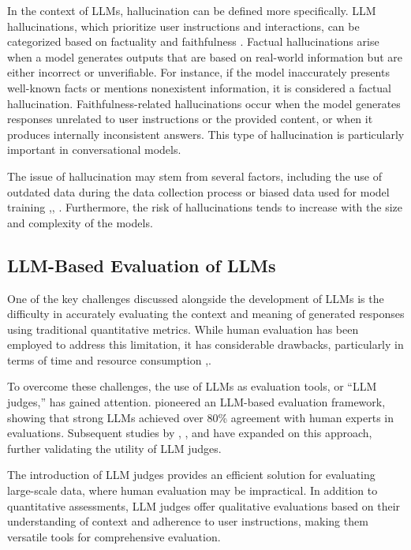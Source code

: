 In the context of LLMs, hallucination can be defined more specifically. LLM hallucinations, which prioritize user instructions and interactions, can be categorized based on factuality and faithfulness \cite{Huang2023b}. Factual hallucinations arise when a model generates outputs that are based on real-world information but are either incorrect or unverifiable. For instance, if the model inaccurately presents well-known facts or mentions nonexistent information, it is considered a factual hallucination. Faithfulness-related hallucinations occur when the model generates responses unrelated to user instructions or the provided content, or when it produces internally inconsistent answers. This type of hallucination is particularly important in conversational models.

The issue of hallucination may stem from several factors, including the use of outdated data during the data collection process \cite{Kasai2024} or biased data \cite{Bender2021} used for model training \cite{Huang2023b},\cite{chiang2022overcomingtheoreticallimitationselfattention},  \cite{Li2023a}. Furthermore, the risk of hallucinations tends to increase with the size and complexity of the models.

\subsection{LLM-Based Evaluation of LLMs}
One of the key challenges discussed alongside the development of LLMs is the difficulty in accurately evaluating the context and meaning of generated responses using traditional quantitative metrics. While human evaluation has been employed to address this limitation, it has considerable drawbacks, particularly in terms of time and resource consumption \cite{Bubeck2023},\cite{Bang2023}.

To overcome these challenges, the use of LLMs as evaluation tools, or “LLM judges,” has gained attention. \cite{Zheng2024} pioneered an LLM-based evaluation framework, showing that strong LLMs achieved over 80\% agreement with human experts in evaluations. Subsequent studies by \cite{Bai2023}, \cite{Liu2023}, and \cite{Li2023b} have expanded on this approach, further validating the utility of LLM judges.

The introduction of LLM judges provides an efficient solution for evaluating large-scale data, where human evaluation may be impractical. In addition to quantitative  assessments, LLM judges offer qualitative evaluations based on their understanding of context and adherence to user instructions, making them versatile tools for comprehensive evaluation.